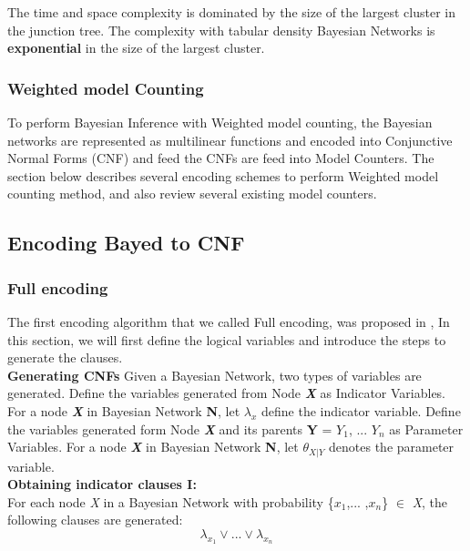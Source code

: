         \noindent The time and space complexity is dominated by the size of the largest cluster in the junction tree. The complexity with tabular density Bayesian Networks is \textbf{exponential} in the size of the largest cluster.
        
        
        \subsubsection{Weighted model Counting}
        To perform Bayesian Inference with Weighted model counting, the Bayesian networks are represented as multi\-linear functions and encoded into Conjunctive Normal Forms (CNF) and feed the CNFs are feed into Model Counters. The section below describes several encoding schemes to perform Weighted model counting method, and also review several existing model counters.
    
    \subsection{Encoding Bayed to CNF}
        \subsubsection{Full encoding}
            The first encoding algorithm that we called Full encoding, was proposed in \cite{enc1}, In this section, we will first define the logical variables and introduce the steps to generate the clauses.\\
            
            \noindent \textbf{Generating CNFs}
            \newline
            Given a Bayesian Network, two types of variables are generated.
            Define the variables generated from Node \textbf{\textit{X}} as Indicator Variables.
            For a node \textbf{\textit{X}} in Bayesian Network \textbf{N}, let $\lambda_x$ define the indicator variable. 
            Define the variables generated form Node \textbf{\textit{X}} and its parents \textbf{Y} = {$Y_{1}$, ... $Y_{n}$} as Parameter Variables.
            For a node \textbf{\textit{X}} in Bayesian Network \textbf{N}, let $\theta_{X|Y}$ denotes the parameter variable.\\
            
            \noindent \textbf{Obtaining indicator clauses \textsc{I}:}\\
            For each node \textit{X} in a Bayesian Network with probability \{$x_{1}$,... ,$x_{n}$\} $\in$ \textit{X}, the following clauses are generated:
            \begin{equation}\label{fullenc_ic1}
                \lambda_{x_{1}} \vee ... \vee \lambda_{x_{n}}
            \end{equation}
            
